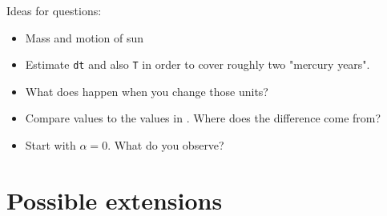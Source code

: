\documentclass[12pt]{iopart}
\begin{document}
Ideas for questions:
\begin{itemize}
	\item Mass and motion of sun
	\item Estimate \texttt{dt} and also \texttt{T} in order to cover roughly two "mercury years".
	\item What does happen when you change those units?
	\item Compare values to the values in \cite{}.  Where does the difference come from?
	\item Start with $\alpha=0$. What do you observe?
\end{itemize}



\section{Possible extensions}\label{sec:extensions}
\end{document}
